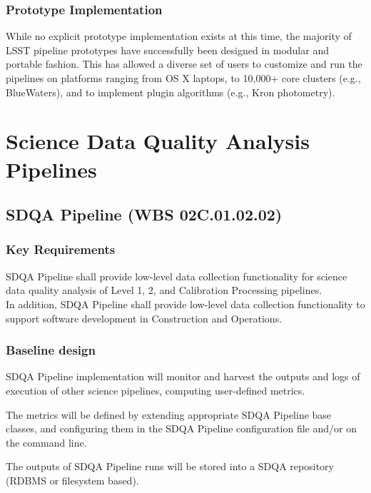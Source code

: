 \documentclass[12pt]{article}
\newcommand{\wbsSDQAP}{WBS 02C.01.02.02}
\begin{document}
\subsubsection{Prototype Implementation}

While no explicit prototype implementation exists at this time, the majority of LSST pipeline prototypes have successfully been designed in modular and portable fashion. This has allowed a diverse set of users to customize and run the pipelines on platforms ranging from OS X laptops, to 10,000+ core clusters (e.g., BlueWaters), and to implement plugin algorithms (e.g., Kron photometry).

\clearpage

\section{Science Data Quality Analysis Pipelines}

\subsection{SDQA Pipeline (\wbsSDQAP)}

\subsubsection{Key Requirements}

SDQA Pipeline shall provide low-level data collection functionality for science data quality analysis of Level 1, 2, and Calibration Processing pipelines.
\\

In addition, SDQA Pipeline shall provide low-level data collection functionality to support software development in Construction and Operations.

\subsubsection{Baseline design}

SDQA Pipeline implementation will monitor and harvest the outputs and logs of execution of other science pipelines, computing user-defined metrics.

The metrics will be defined by extending appropriate SDQA Pipeline base classes, and configuring them in the SDQA Pipeline configuration file and/or on the command line.

The outputs of SDQA Pipeline runs will be stored into a SDQA repository (RDBMS or filesystem based).
\end{document}
